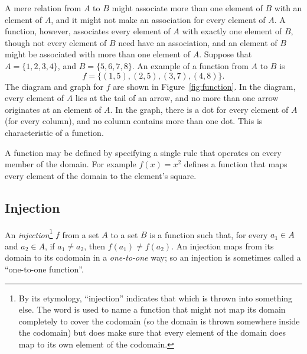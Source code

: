 \noindent A mere relation from $A$ to $B$ might associate more than one element
of $B$ with an element of $A$, and it might not make an association for every
element of $A$. A function, however, associates every element of $A$ with
exactly one element of $B$, though not every element of $B$ need have an
association, and an element of $B$ might be associated with more than one
element of $A$. Suppose that $A = \{1, 2, 3, 4\}$, and $B = \{5, 6, 7, 8\}$.
An example of a function from $A$ to $B$ is
\begin{equation*}
   f = \{(1,5), (2,5), (3,7), (4,8)\}.
\end{equation*}
The diagram and graph for $f$ are shown in Figure~\ref{fig:function}.  In the
diagram, every element of $A$ lies at the tail of an arrow, and no more than
one arrow originates at an element of $A$.  In the graph, there is a dot for
every element of $A$ (for every column), and no column contains more than one
dot.  This is characteristic of a function.

A function may be defined by specifying a single rule that operates on every
member of the domain. For example $f(x) = x^2$ defines a function that maps
every element of the domain to the element's square.

\subsection{Injection}

\begin{definition}
   An \emph{injection}\footnote{%
      By its etymology, ``injection'' indicates that which is thrown into
      something else. The word is used to name a function that might not map
      its domain completely to cover the codomain (so the domain is thrown
      somewhere inside the codomain) but does make sure that every element of
      the domain does map to its own element of the codomain.
   }
   $f$ from a set $A$ to a set $B$ is a function such that, for every $a_1 \in
   A$ and $a_2 \in A$, if $a_1 \neq a_2$, then $f(a_1) \neq f(a_2)$. An
   injection maps from its domain to its codomain in a \emph{one-to-one} way;
   so an injection is sometimes called a ``one-to-one function''.
\end{definition}

